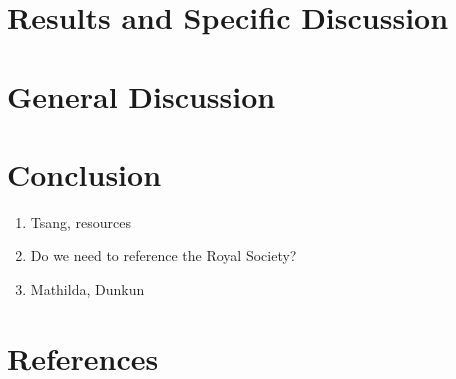 \documentclass[10pt]{iopart}
\begin{document}

\section{Results and Specific Discussion}

\lipsum

\section{General Discussion}


\lipsum

\section{Conclusion}

\ack

\begin{enumerate}
	\item Tsang, resources
	\item Do we need to reference the Royal Society?
	\item Mathilda, Dunkun
\end{enumerate}

\section*{References}


\end{document}
